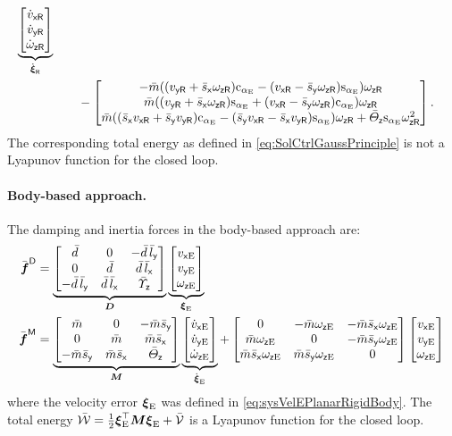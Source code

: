 \begin{subequations}
\begin{align}
 \underbrace{\begin{bmatrix} \vxRd \\ \vyRd \\ \wzRd \end{bmatrix}}_{\sysVelRd}
\nonumber\\
 &\qquad- 
 \begin{bmatrix} -\mc((\vyR + \scx\wzR)\caE - (\vxR-\scy\wzR)\saE) \wzR \\ \mc((\vyR + \scx\wzR)\saE + (\vxR-\scy\wzR)\caE) \wzR \\ \mc((\scx\vxR+\scy\vyR)\caE - (\scy\vxR-\scx\vyR)\saE)\wzR + \Jcz\saE\wzR^2 \end{bmatrix}.
\end{align}
\end{subequations}
The corresponding total energy as defined in \eqref{eq:SolCtrlGaussPrinciple} is not a Lyapunov function for the closed loop.

\paragraph{Body-based approach.}
The damping and inertia forces in the body-based approach are:
\begin{subequations}
\begin{align}
 \genForceDissC &= \underbrace{\begin{bmatrix} \dc & 0 &-\dc\,\lcy \\ 0 & \dc & \dc\,\lcx \\ -\dc\,\lcy & \dc\,\lcx & \sigcz \end{bmatrix}}_{\sysDissMat}
 \underbrace{\begin{bmatrix} \vxE \\ \vyE \\ \wzE \end{bmatrix}}_{\sysVelE}
\\
 \genForceInertiaC &= \underbrace{\begin{bmatrix} \mc & 0 & -\mc\scy \\ 0 & \mc & \mc\scx \\ -\mc\scy & \mc\scx & \Jcz \end{bmatrix}}_{\sysInertiaMat}
 \underbrace{\begin{bmatrix} \vxEd \\ \vyEd \\ \wzEd \end{bmatrix}}_{\sysVelEd}
 + \begin{bmatrix} 0 & -\mc\wzE & -\mc\scx\wzE \\ \mc\wzE & 0 & -\mc\scy\wzE \\ \mc\scx\wzE & \mc\scy\wzE & 0 \end{bmatrix}
 \begin{bmatrix} \vxE \\ \vyE \\ \wzE \end{bmatrix}
\end{align} 
\end{subequations}
where the velocity error $\sysVelE$ was defined in \eqref{eq:sysVelEPlanarRigidBody}.
The total energy $\totalEnergyC = \tfrac{1}{2} \sysVelE^\top \sysInertiaMat \sysVelE + \potentialEnergyC$ is a Lyapunov function for the closed loop.

